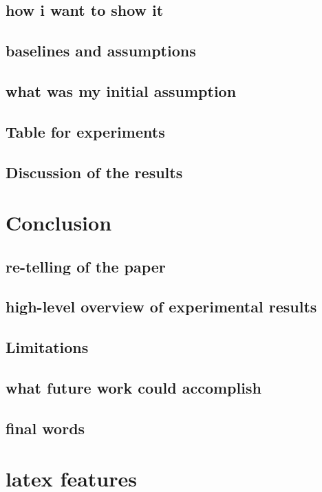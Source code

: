 \documentclass[a4paper,11pt,oneside]{memoir}
\begin{document}
\section{how i want to show it}
\section{baselines and assumptions}
\section{what was my initial assumption}
\section{Table for experiments}
\section{Discussion of the results}

\chapter{Conclusion}
\section{re-telling of the paper}
\section{high-level overview of experimental results}
\section{Limitations}
\section{what future work could accomplish}
\section{final words}
		
\newpage
			
\chapter{latex features}
\\ \noindent{}\\\\\\
\end{document}
